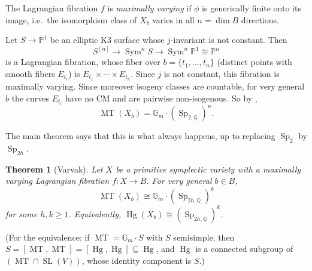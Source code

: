 \documentclass[12pt]{amsart}
\newcommand{\Q}{\mathbb{Q}}
\newcommand{\PP}{\mathbb{P}}
\newcommand{\Gm}{\mathbb{G}_m}
\DeclareMathOperator{\SL}{SL}
\DeclareMathOperator{\Sp}{Sp}
\DeclareMathOperator{\MT}{MT}
\DeclareMathOperator{\Hg}{Hg}
\DeclareMathOperator{\Sym}{Sym}
\newtheorem{theorem}{Theorem}[section]
\theoremstyle{definition}
\theoremstyle{remark}
\numberwithin{equation}{section}
\begin{document}
\begin{definition}
    The Lagrangian fibration $f$ is \emph{maximally varying} if $\phi$ is
    generically finite onto its image, i.e.\ the isomorphism class of $X_b$
    varies in all $n = \dim B$ directions.
\end{definition}

\begin{example}\label{ex:K3n}
    Let $S \to \PP^1$ be an elliptic K3 surface whose $j$-invariant is not
    constant. Then
    \begin{equation*}
        S^{[n]} \to \Sym^n S \to \Sym^n \PP^1 \cong \PP^n
    \end{equation*}
    is a Lagrangian fibration, whose fiber over $b = \{t_1, \ldots, t_n\}$
    (distinct points with smooth fibers $E_{t_i}$) is
    $E_{t_1} \times \cdots \times E_{t_n}$. Since $j$ is not constant, this
    fibration is maximally varying. Since moreover isogeny classes are
    countable, for very general $b$ the curves $E_{t_i}$ have no CM and are
    pairwise non-isogenous. So by
    ,
    \begin{equation*}
        \MT(X_b) = \Gm \cdot (\Sp_{2,\Q})^n.
    \end{equation*}
\end{example}

The main theorem says that this is what always happens, up to replacing
$\Sp_2$ by $\Sp_{2h}$.

\begin{theorem}[Varvak]\label{thm:main}
    Let $X$ be a primitive symplectic variety with a maximally varying
    Lagrangian fibration $f \colon X \to B$. For very general $b \in B$,
    \begin{equation*}
        \MT(X_b) \cong \Gm \cdot (\Sp_{2h, \Q})^k
    \end{equation*}
    for some $h, k \geq 1$. Equivalently, $\Hg(X_b) \cong (\Sp_{2h,\Q})^k$.
\end{theorem}

(For the equivalence: if $\MT = \Gm \cdot S$ with $S$ semisimple, then
$S = [\MT, \MT] = [\Hg, \Hg] \subseteq \Hg$, and $\Hg$ is a connected subgroup of
$(\MT \cap \SL(V))$, whose identity component is $S$.)
\end{document}
